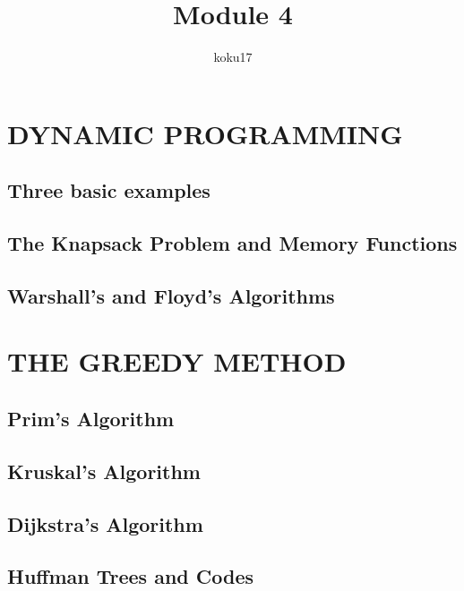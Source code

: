 \documentclass{article}
\author{koku17}
\title{Module 4}
\begin{document}
	\maketitle \thispagestyle{empty} \newpage
	\tableofcontents \thispagestyle{empty} \newpage \setcounter{page}{1}
	\section{DYNAMIC PROGRAMMING}
	\subsection{Three basic examples}
	\subsection{The Knapsack Problem and Memory Functions}
	\subsection{Warshall's and Floyd's Algorithms}

	\section{THE GREEDY METHOD}
	\subsection{Prim's Algorithm}
	\subsection{Kruskal's Algorithm}
	\subsection{Dijkstra's Algorithm}
	\subsection{Huffman Trees and Codes}
\end{document}
